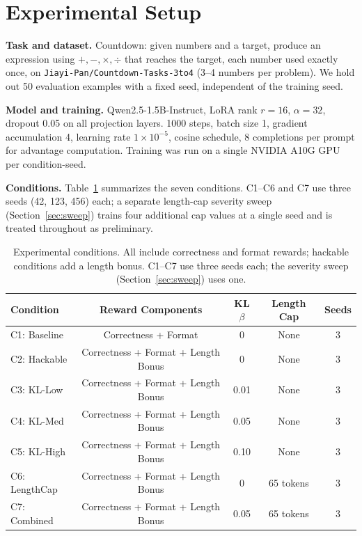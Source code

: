 \documentclass{article}
\begin{document}
\section{Experimental Setup}

\textbf{Task and dataset.} Countdown: given numbers and a target, produce an expression using $+,-,\times,\div$ that reaches the target, each number used exactly once, on \texttt{Jiayi-Pan/Countdown-Tasks-3to4} (3--4 numbers per problem). We hold out 50 evaluation examples with a fixed seed, independent of the training seed.

\textbf{Model and training.} Qwen2.5-1.5B-Instruct, LoRA rank $r=16$, $\alpha=32$, dropout 0.05 on all projection layers. 1000 steps, batch size 1, gradient accumulation 4, learning rate $1\times10^{-5}$, cosine schedule, 8 completions per prompt for advantage computation. Training was run on a single NVIDIA A10G GPU per condition-seed.

\textbf{Conditions.} Table~\ref{tab:conditions} summarizes the seven conditions. C1--C6 and C7 use three seeds (42, 123, 456) each; a separate length-cap severity sweep (Section~\ref{sec:sweep}) trains four additional cap values at a single seed and is treated throughout as preliminary.

\begin{table}[h]
\centering
\caption{Experimental conditions. All include correctness and format rewards; hackable conditions add a length bonus. C1--C7 use three seeds each; the severity sweep (Section~\ref{sec:sweep}) uses one.}
\label{tab:conditions}
\small
\begin{tabular}{lcccc}
\toprule
\textbf{Condition} & \textbf{Reward Components} & \textbf{KL $\beta$} & \textbf{Length Cap} & \textbf{Seeds} \\
\midrule
C1: Baseline & Correctness + Format & 0 & None & 3 \\
C2: Hackable & Correctness + Format + Length Bonus & 0 & None & 3 \\
C3: KL-Low & Correctness + Format + Length Bonus & 0.01 & None & 3 \\
C4: KL-Med & Correctness + Format + Length Bonus & 0.05 & None & 3 \\
C5: KL-High & Correctness + Format + Length Bonus & 0.10 & None & 3 \\
C6: LengthCap & Correctness + Format + Length Bonus & 0 & 65 tokens & 3 \\
C7: Combined & Correctness + Format + Length Bonus & 0.05 & 65 tokens & 3 \\
\bottomrule
\end{tabular}
\end{table}
\end{document}
